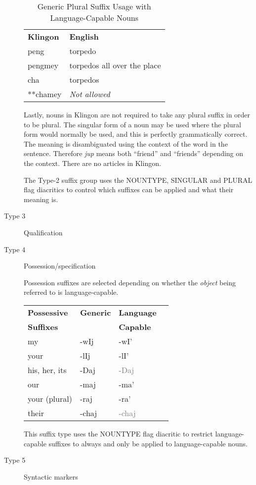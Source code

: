 \documentclass[11pt]{article}
\begin{document}
\begin{description}
	\begin{table}[h]
\begin{center}
\begin{tabular}{l|l}
\bf Klingon & \bf English \\
peng & torpedo \\
pengmey & torpedos all over the place \\
cha & torpedos \\
**chamey & \it Not allowed \\
\end{tabular}
\end{center}
\caption{Generic Plural Suffix Usage with Language-Capable Nouns}
\end{table}

	Lastly, nouns in Klingon are not required to take any plural suffix in order to be plural. The singular form of a noun may be used where the plural form would normally be used, and this is perfectly grammatically correct. The meaning is disambiguated using the context of the word in the sentence. Therefore \textit{jup} means both ``friend'' and ``friends'' depending on the context. There are no articles in Klingon.
	
	The Type-2 suffix group uses the NOUNTYPE, SINGULAR and PLURAL flag diacritics to control which suffixes can be applied and what their meaning is.

	\item[Type 3] Qualification
	\item[Type 4] Possession/specification
	
	Possession suffixes are selected depending on whether the \textit{object} being referred to is language-capable.

	\begin{center}
	\begin{tabular}{ | l | l | l | l |}
	\hline
	\bf{Possessive} & \bf{Generic} & \bf{Language} \\
	\bf{Suffixes} & & \bf{Capable} \\ \hline
	my & -wIj & -wI' \\ \hline
	your & -lIj & -lI' \\ \hline
	his, her, its & -Daj & \textcolor{gray}{-Daj} \\ \hline
	our & -maj & -ma' \\ \hline
	your (plural) & -raj & -ra' \\ \hline
	their & -chaj & \textcolor{gray}{-chaj} \\
	\hline
	\end{tabular}
	\end{center}
	
	This suffix type uses the NOUNTYPE flag diacritic to restrict language-capable suffixes to always and only be applied to language-capable nouns.

	\item[Type 5] Syntactic markers
\end{description}
\end{document}
